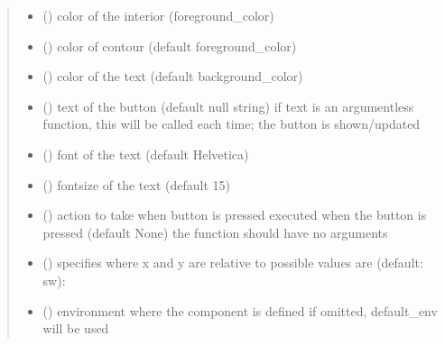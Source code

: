 \documentclass[letterpaper,10pt,english]{sphinxmanual}
\begin{document}
\begin{fulllineitems}
\begin{quote}
\begin{description}
\begin{itemize}
\item {} 
 () \textendash{} color of the interior (foreground\_color)

\item {} 
 () \textendash{} color of contour (default foreground\_color)

\item {} 
 () \textendash{} color of the text (default background\_color)

\item {} 
 () \textendash{} text of the button (default null string) 
if text is an argumentless function, this will be called each time;
the button is shown/updated

\item {} 
 () \textendash{} font of the text (default Helvetica)

\item {} 
 () \textendash{} fontsize of the text (default 15)

\item {} 
 () \textendash{} action to take when button is pressed 
executed when the button is pressed (default None)
the function should have no arguments 

\item {} 
 () \textendash{} specifies where x and y are relative to 
possible values are (default: sw): 

\item {} 
 ({\hyperref[\detokenize{Reference:salabim.Environment}]{}}) \textendash{} environment where the component is defined 
if omitted, default\_env will be used

\end{itemize}

\end{description}\end{quote}


\end{fulllineitems}
\end{document}
